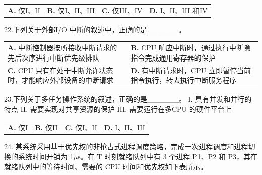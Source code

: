 \documentclass[UTF8,11pt]{ctexart}
\begin{document}
\begin{center}\begin{tabular}{>{\raggedright\arraybackslash}p{\dimexpr(\linewidth-8\tabcolsep)/4\relax}>{\raggedright\arraybackslash}p{\dimexpr(\linewidth-8\tabcolsep)/4\relax}>{\raggedright\arraybackslash}p{\dimexpr(\linewidth-8\tabcolsep)/4\relax}>{\raggedright\arraybackslash}p{\dimexpr(\linewidth-8\tabcolsep)/4\relax}}
\textbf{A.} 仅I、II & \textbf{B.} 仅I、II、III & \textbf{C.} 仅III、IV & \textbf{D.} I、II、III 和IV\\[.35em]\end{tabular}\end{center}

22.下列关于外部I/O 中断的叙述中，正确的是\_\_\_\_\_\_。


\begin{center}\begin{tabular}{>{\raggedright\arraybackslash}p{\dimexpr(\linewidth-4\tabcolsep)/2\relax}>{\raggedright\arraybackslash}p{\dimexpr(\linewidth-4\tabcolsep)/2\relax}}
\textbf{A.} 中断控制器按所接收中断请求的先后次序进行中断优先级排队 & \textbf{B.} CPU 响应中断时，通过执行中断隐指令完成通用寄存器的保护\\[.35em]
\textbf{C.} CPU 只有在处于中断允许状态时，才能响应外部设备的中断请求 & \textbf{D.} 有中断请求时，CPU 立即暂停当前指令执行，转去执行中断服务程序\\[.35em]\end{tabular}\end{center}

23.下列关于多任务操作系统的叙述，正确的是\_\_\_\_\_\_。 I. 具有并发和并行的特点 II. 需要实现对共享资源的保护 III. 需要运行在多CPU 的硬件平台上


\begin{center}\begin{tabular}{>{\raggedright\arraybackslash}p{\dimexpr(\linewidth-8\tabcolsep)/4\relax}>{\raggedright\arraybackslash}p{\dimexpr(\linewidth-8\tabcolsep)/4\relax}>{\raggedright\arraybackslash}p{\dimexpr(\linewidth-8\tabcolsep)/4\relax}>{\raggedright\arraybackslash}p{\dimexpr(\linewidth-8\tabcolsep)/4\relax}}
\textbf{A.} 仅I & \textbf{B.} 仅II & \textbf{C.} 仅I、II & \textbf{D.} I、II、III\\[.35em]\end{tabular}\end{center}

24. 某系统采用基于优先权的非抢占式进程调度策略，完成一次进程调度和进程切换的系统时间开销为 1\(\displaystyle \mu\mathrm{s}\)。在 T 时刻就绪队列中有 3 个进程 P1、P2 和 P3，其在就绪队列中的等待时间、需要的 CPU 时间和优先权如下表所示。
\end{document}
